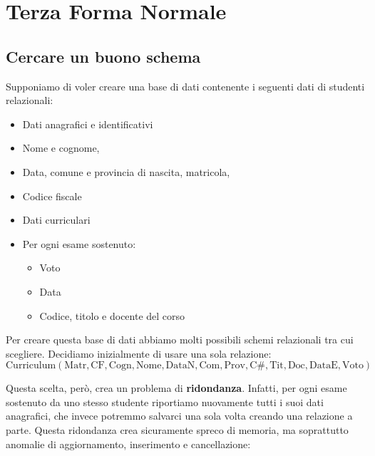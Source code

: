 \documentclass[11pt, a4paper, titlepage, oneside]{scrbook}
\begin{document}
\chapter{Terza Forma Normale}

\section{Cercare un buono schema}

Supponiamo di voler creare una base di dati contenente i seguenti dati di studenti relazionali:

\begin{itemize}
    \item Dati anagrafici e identificativi
    \item Nome e cognome,
    \item Data, comune e provincia di nascita, matricola,
    \item Codice fiscale
    \item Dati curriculari
    \item Per ogni esame sostenuto:
    \begin{itemize}
    \item  Voto
    \item  Data
    \item  Codice, titolo e docente del corso
    \end{itemize}
\end{itemize}

Per creare questa base di dati abbiamo molti possibili schemi relazionali tra cui scegliere. Decidiamo inizialmente di usare una sola relazione:
\[
\text{Curriculum}(\text{Matr}, \text{CF}, \text{Cogn}, \text{Nome}, \text{DataN}, \text{Com}, \text{Prov}, \text{C}\#, \text{Tit}, \text{Doc}, \text{DataE}, \text{Voto})
\]

Questa scelta, però, crea un problema di \textbf{ridondanza}. Infatti, per ogni esame sostenuto da uno stesso studente riportiamo nuovamente tutti i suoi dati anagrafici, che invece potremmo salvarci una sola volta creando una relazione a parte. Questa ridondanza crea sicuramente spreco di memoria, ma soprattutto anomalie di aggiornamento, inserimento e cancellazione:
\end{document}
